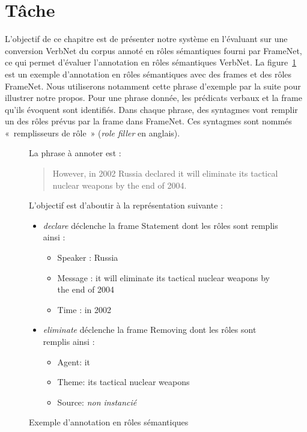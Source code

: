 \section{Tâche}

L'objectif de ce chapitre est de présenter notre système en l'évaluant sur une
conversion VerbNet du corpus annoté en rôles sémantiques fourni par FrameNet,
ce qui permet d'évaluer l'annotation en rôles sémantiques VerbNet. La
figure~\ref{fig:srlrussia} est un exemple d'annotation en rôles sémantiques
avec des frames et des rôles FrameNet. Nous utiliserons notamment cette phrase
d'exemple par la suite pour illustrer notre propos. Pour une phrase donnée, les
prédicats verbaux et la frame qu'ils évoquent sont identifiés. Dans chaque
phrase, des syntagmes vont remplir un des rôles prévus par la frame dans
FrameNet. Ces syntagmes sont nommés «~remplisseurs de rôle~» (\emph{role
filler} en anglais).

\begin{figure}[ht]
    La phrase à annoter est :

    \begin{quote}
    However, in 2002 Russia declared it will eliminate its tactical nuclear weapons by the end of 2004.
    \end{quote}

    L'objectif est d'aboutir à la représentation suivante :

    \begin{itemize}
        \item \emph{declare} déclenche la frame Statement dont les rôles sont remplis ainsi :
        \begin{itemize}
            \item Speaker : Russia
            \item Message : it will eliminate its tactical nuclear weapons by the end of 2004
            \item Time : in 2002
        \end{itemize}
        \item \emph{eliminate} déclenche la frame Removing dont les rôles sont remplis ainsi :
        \begin{itemize}
            \item Agent: it
            \item Theme: its tactical nuclear weapons
            \item Source: \emph{non instancié}
        \end{itemize}
    \end{itemize}
    \caption{\label{fig:srlrussia}Exemple d'annotation en rôles sémantiques}
\end{figure}

